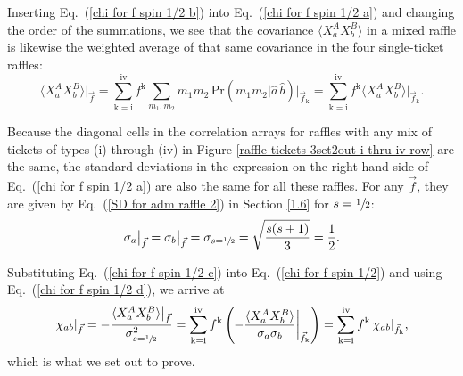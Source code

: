 Inserting Eq.\ (\ref{chi for f spin 1/2 b}) into Eq.\ (\ref{chi for f spin 1/2 a}) and changing the order of the summations, we see that the covariance $\langle X^A_a X^B_b \rangle$ in a mixed raffle is likewise the weighted average of that same covariance in the four single-ticket raffles:
\begin{equation}
\langle X^A_a X^B_b \rangle \big|_{\vec{f}} = \sum_{\mathrm{k} = \mathrm{i}}^{\mathrm{iv}} f^{\mathrm{k}} \sum_{m_1, m_2} \! m_1  m_2 \, \mathrm{Pr}(m_1 m_2| \hat{a} \,\hat{b}) 
\Big|_{\vec{f}_{\mathrm{k}}} =  \sum_{\mathrm{k} = \mathrm{i}}^{\mathrm{iv}} f^{\mathrm{k}} \langle X^A_a X^B_b \rangle \big|_{\vec{f}_{\mathrm{k}}}. 
\label{chi for f spin 1/2 c}
\end{equation}

Because the diagonal cells in the correlation arrays for raffles with any mix of tickets of types (i) through (iv) in Figure \ref{raffle-tickets-3set2out-i-thru-iv-row} are the same, the standard deviations in the expression on the right-hand side of Eq.\ (\ref{chi for f spin 1/2 a}) are also the same for all these raffles. For any $\vec{f}$, they are given by Eq.\ (\ref{SD for adm raffle 2}) in Section \ref{1.6} for $s=\sfrac12$:
\begin{equation}
\sigma_a  \big|_{\vec{f}} = \sigma_b  \big|_{\vec{f}} = \sigma_{s = \sfrac12} = \sqrt{\frac{s(s+1)}{3}} = \frac12.
\label{chi for f spin 1/2 d}
\end{equation}

Substituting Eq.\ (\ref{chi for f spin 1/2 c}) into Eq.\ (\ref{chi for f spin 1/2}) and using Eq.\ (\ref{chi for f spin 1/2 d}), we arrive at
\begin{equation}
\chi_{ab} |_{\vec{f}} = -\frac{\langle X^A_a X^B_b \rangle \big|_{\vec{f}}}{\sigma_{s=\sfrac12}^2}  =
\sum_{\mathrm{k} = \mathrm{i}}^{\mathrm{iv}} f^{\mathrm{k}} \left( \! \left. -\frac{\langle X^A_a X^B_b \rangle  }{ \sigma_a \sigma_b }  \right|_{ \vec{f}_{ \mathrm{k} } } \right)
=  \sum_{\mathrm{k} = \mathrm{i}}^{\mathrm{iv}} f^{\mathrm{k}} \, \chi_{ab} |_{\vec{f}_{\mathrm{k}} },
\label{chi for f spin 1/2 e}
\end{equation}
which is what we set out to prove. 

